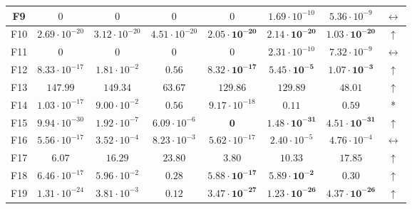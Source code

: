 \begin{table}[!t]
\begin{scriptsize}
\begin{tabular}{c || c c c | c c c c}
F9  & $0$                    & $0$                   & $0$                   & $0$                            & $1.69 \cdot 10^{-10}$          & $5.36 \cdot 10^{-9}$           & $\leftrightarrow$   \\ \hline
F10 & $2.69 \cdot 10^{-20}$  & $3.12 \cdot 10^{-20}$ & $4.51 \cdot 10^{-20}$ & $\mathbf{2.05 \cdot 10^{-20}}$ & $\mathbf{2.14 \cdot 10^{-20}}$ & $\mathbf{1.03 \cdot 10^{-20}}$ & $\uparrow$          \\ \hline
F11 & $0$                    & $0$                   & $0$                   & $0$                            & $2.31 \cdot 10^{-10}$          & $7.32 \cdot 10^{-9}$           & $\leftrightarrow$   \\ \hline
F12 & $8.33 \cdot 10^{-17}$  & $1.81 \cdot 10^{-2}$  & $0.56$                & $\mathbf{8.32 \cdot 10^{-17}}$ & $\mathbf{5.45 \cdot 10^{-5}}$  & $\mathbf{1.07 \cdot 10^{-3}}$  & $\uparrow$          \\ \hline
F13 & $147.99$               & $149.34$              & $63.67$               & $\mathbf{129.86}$              & $\mathbf{129.89}$              & $\mathbf{48.01}$               & $\uparrow$          \\ \hline
F14 & $1.03 \cdot 10^{-17}$  & $9.00 \cdot 10^{-2}$  & $0.56$                & ${9.17 \cdot 10^{-18}}$        & $0.11$                         & ${0.59}$                       & *                   \\ \hline
F15 & $9.94 \cdot 10^{-30}$  & $1.92 \cdot 10^{-7}$  & $6.09 \cdot 10^{-6}$  & $\mathbf{0}$                   & $\mathbf{1.48 \cdot 10^{-31}}$ & $\mathbf{4.51 \cdot 10^{-31}}$ & $\uparrow$          \\ \hline
F16 & $5.56 \cdot 10^{-17}$  & $3.52 \cdot 10^{-4}$  & $8.23 \cdot 10^{-3}$  & ${5.62 \cdot 10^{-17}}$        & ${2.40 \cdot 10^{-5}}$         & ${4.76 \cdot 10^{-4}}$         & $\leftrightarrow$   \\ \hline
F17 & $6.07$                 & $16.29$               & $23.80$               & $\mathbf{3.80}$                & $\mathbf{10.33}$               & $\mathbf{17.85}$               & $\uparrow$          \\ \hline
F18 & $6.46 \cdot 10^{-17}$  & $5.96 \cdot 10^{-2}$  & $0.28$                & $\mathbf{5.88 \cdot 10^{-17}}$ & $\mathbf{5.89 \cdot 10^{-2}}$  & $\mathbf{0.30}$                & $\uparrow$   \\ \hline
F19 & $1.31 \cdot 10^{-24}$  & $3.81 \cdot 10^{-3}$  & $0.12$                & $\mathbf{3.47 \cdot 10^{-27}}$ & $\mathbf{1.23 \cdot 10^{-26}}$ & $\mathbf{4.37 \cdot 10^{-26}}$ & $\uparrow$          \\ \hline
\end{tabular}
\end{scriptsize}
\end{table}

